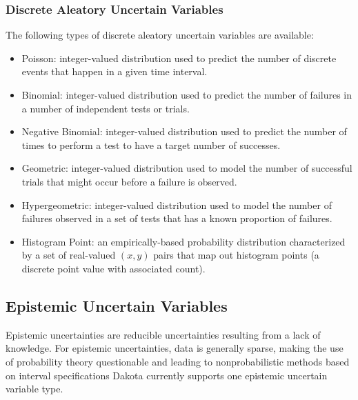 \subsubsection{Discrete Aleatory Uncertain Variables}\label{variables:uncertain:dauv}

The following types of discrete aleatory uncertain variables are available:

\begin{itemize}

\item Poisson: integer-valued distribution used to predict the number of 
  discrete events that happen in a given time interval.

\item Binomial: integer-valued distribution used to predict 
  the number of failures in a number of independent tests or trials.

\item Negative Binomial: integer-valued distribution used to predict the
  number of times to perform a test to have a target number of successes.

\item Geometric: integer-valued distribution used to model the number of 
  successful trials that might occur before a failure is observed.

\item Hypergeometric: integer-valued distribution used to model the number 
  of failures observed in a set of tests that has a known proportion of 
  failures.

\item Histogram Point: an empirically-based probability distribution 
  characterized by a set of real-valued $(x,y)$ pairs that map out
  histogram points (a discrete point value with associated count).

\end{itemize}


\subsection{Epistemic Uncertain Variables}\label{variables:uncertain:euv}

Epistemic uncertainties are reducible uncertainties resulting from a
lack of knowledge.  For epistemic uncertainties, data is generally
sparse, making the use of probability theory questionable and leading
to nonprobabilistic methods based on interval specifications  Dakota
currently supports one epistemic uncertain variable type.

